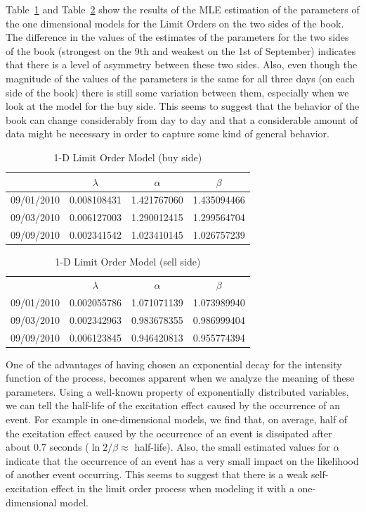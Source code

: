 Table~\ref{tab:limmodbuy} and Table~\ref{tab:limmodsell} show the results of the MLE estimation of the parameters of the one dimensional models for the Limit Orders on the two sides of the book. The difference in the values of the estimates of the parameters for the two sides of the book (strongest on the 9th and weakest on the 1st of September) indicates that there is a level of asymmetry between these two sides. Also, even though the magnitude of the values of the parameters is the same for all three days (on each side of the book) there is still some variation between them, especially when we look at the model for the buy side. This seems to suggest that the behavior of the book can change considerably from day to day and that a considerable amount of data might be necessary in order to capture some kind of general behavior. 
	\begin{table}[!htbp]
	\centering
	\caption{1-D Limit Order Model (buy side) \label{tab:limmodbuy}}
	\begin{tabular}{c|ccc} 
		& $\lambda$ & $\alpha$  & $\beta$ \\ \hline
	09/01/2010 & 0.008108431 & 1.421767060 & 1.435094466 \\
	09/03/2010 & 0.006127003 & 1.290012415 & 1.299564704 \\
	09/09/2010 & 0.002341542 & 1.023410145 & 1.026757239
	\end{tabular}
	\end{table}
	\begin{table}
	\centering
	\caption{1-D Limit Order Model (sell side) \label{tab:limmodsell}}
	\begin{tabular}{c|ccc} 
		& $\lambda$ & $\alpha$ & $\beta$ \\
	09/01/2010 & 0.002055786 & 1.071071139 & 1.073989940 \\
	09/03/2010 & 0.002342963 & 0.983678355 & 0.986999404 \\
	09/09/2010 & 0.006123845 & 0.946420813 & 0.955774394
	\end{tabular}
	\end{table}


One of the advantages of having chosen an exponential decay for the intensity function of the process, becomes apparent when we analyze the meaning of these parameters. Using a well-known property of exponentially distributed variables, we can tell the half-life of the excitation effect caused by the occurrence of an event. For example in one-dimensional models, we find that, on average, half of the excitation effect caused by the occurrence of an event is dissipated after about 0.7 seconds ($\ln 2/\beta \approx$ half-life). Also, the small estimated values for $\alpha$ indicate that the occurrence of an event has a very small impact on the likelihood of another event occurring. This seems to suggest that there is a weak self-excitation effect in the limit order process when modeling it with a one-dimensional model. 


